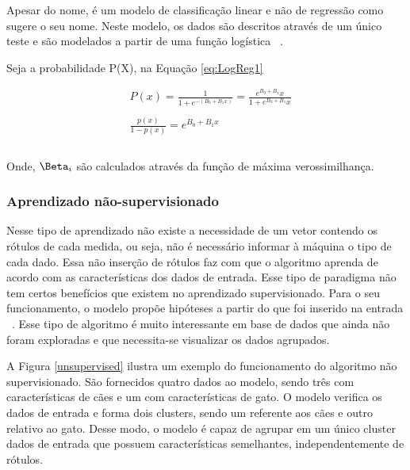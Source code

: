           Apesar do nome, é um modelo de classificação linear e não de regressão como sugere o seu nome. Neste modelo, os dados
          são descritos através de um único teste e são modelados a partir de uma função logística ~\cite{nasrabadi2007pattern}.

          Seja a probabilidade P(X), na Equação \ref{eq:LogReg1}


          \begin{equation}\label{eq:LogReg1}
            \begin{aligned}
              & P(x) = \frac{1}{1+e^{-(B_{0}+B_{1}x)}} = \frac{e^{B_{0} + B_{1}}x}{1+e^{B_{0}+B_{1}}x }\\ \\
              & \frac{p(x)}{1-p(x)} = e^{B_{0}+B_{1}x}\\ \\
          \end{aligned} 
          \end{equation}
         
          Onde, $\Beta_{i}$ são calculados através da função de máxima verossimilhança. 

    \subsubsection{Aprendizado não-supervisionado}

          Nesse tipo de aprendizado não existe a necessidade de um vetor contendo os rótulos de cada medida, ou seja, não é 
          necessário informar à máquina o tipo de cada dado. Essa não inserção de rótulos faz com que o algoritmo aprenda de acordo 
          com as características dos dados de entrada. Esse tipo de paradigma não tem certos benefícios que existem  no aprendizado supervisionado. 
          Para o seu funcionamento, o modelo propõe hipóteses a partir do que foi inserido na entrada ~\cite{bonaccorso2017machine}. Esse tipo de algoritmo 
          é muito interessante em base de dados que ainda não foram exploradas e que necessita-se visualizar os dados agrupados.

          A Figura \ref{unsupervised} ilustra um exemplo do funcionamento do algoritmo não supervisionado. São fornecidos quatro dados ao modelo, sendo três com características de cães e um com características de gato. O modelo verifica os dados de entrada e forma dois clusters, sendo um referente aos cães e outro relativo ao gato. Desse modo, o modelo é capaz de agrupar em um único cluster dados de entrada que possuem características semelhantes, independentemente de rótulos.

